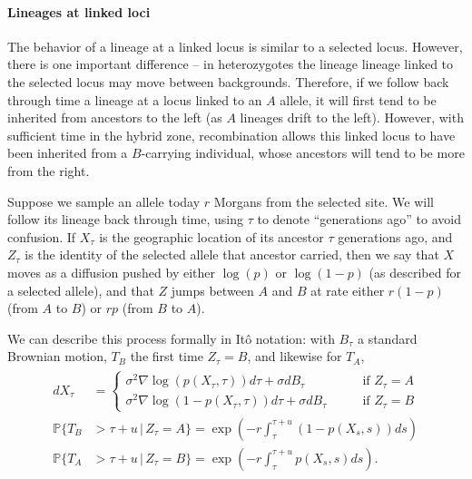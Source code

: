 \documentclass[11pt,letterpaper]{article}
\renewcommand{\P}{\mathbb{P}}
\newcommand{\grad}{\nabla}
\newcommand{\given}{\,\vert\,}
\begin{document}
\paragraph{Lineages at linked loci}
The behavior of a lineage at a linked locus is similar to a selected locus. 
However, there is one important difference -- in heterozygotes the lineage lineage linked to the selected locus may move between backgrounds. 
Therefore, if we follow back through time a lineage at a locus linked to an $A$ allele, 
it will first tend to be inherited from ancestors to the left (as $A$ lineages drift to the left). 
However, with sufficient time in the hybrid zone, recombination allows this linked locus 
to have been inherited from a $B$-carrying individual,
whose ancestors will tend to be more from the right.

Suppose we sample an allele today $r$ Morgans from the selected site. 
We will follow its lineage back through time, using $\tau$ to denote ``generations ago'' to avoid confusion.
If $X_\tau$ is the geographic location of its ancestor $\tau$ generations ago,
and $Z_\tau$ is the identity of the selected allele that ancestor carried,
then we say that $X$ moves as a diffusion pushed by either $\log(p)$ or $\log(1-p)$ 
(as described for a selected allele),
and that $Z$ jumps between $A$ and $B$ at rate either $r (1-p)$  (from $A$ to $B$) or $r p$ (from $B$ to $A$).

We can describe this process formally in It\^o notation:
with $B_\tau$ a standard Brownian motion,
$T_B$ the first time $Z_\tau = B$, and likewise for $T_A$,
\begin{align}
    \begin{aligned} \label{eqn:lineage_motion}
        dX_\tau &= \begin{cases}
             \sigma^2 \grad \log(p(X_\tau,\tau)) d\tau + \sigma dB_\tau \qquad & \text{if } Z_\tau = A \\
             \sigma^2 \grad \log(1-p(X_\tau,\tau)) d\tau + \sigma dB_\tau \qquad & \text{if } Z_\tau = B 
        \end{cases} \\
        \P\{ T_B &> \tau+u \given Z_\tau = A \} = \exp\left( - r \int_\tau^{\tau+u} (1-p(X_s,s)) ds \right) \\
        \P\{ T_A &> \tau+u \given Z_\tau = B \} = \exp\left( - r \int_\tau^{\tau+u} p(X_s,s) ds \right) .
    \end{aligned}
\end{align}
\end{document}
